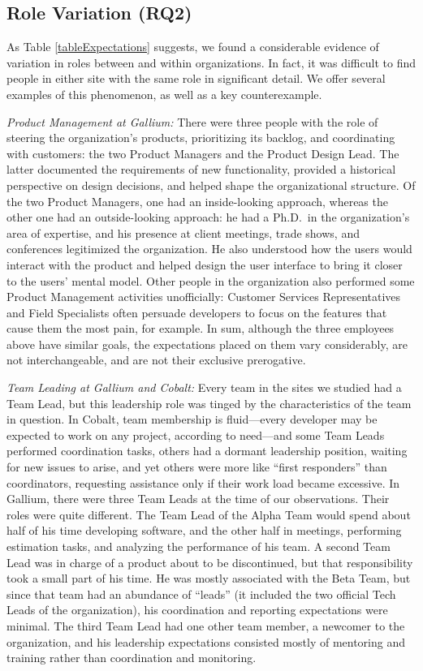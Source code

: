 \documentclass[10pt, conference, compsocconf]{IEEEtran}
\begin{document}
\subsection{Role Variation (RQ2)}

As Table \ref{tableExpectations} suggests, we found a considerable evidence of variation in roles between and within organizations. In fact, it was difficult to find people in either site with the same role in significant detail. We offer several examples of this phenomenon, as well as a key counterexample.

\emph{Product Management at Gallium:} There were three people with the role of steering the organization's products, prioritizing its backlog, and coordinating with customers: the two Product Managers and the Product Design Lead. The latter documented the requirements of new functionality, provided a historical perspective on design decisions, and helped shape the organizational structure. Of the two Product Managers, one had an inside-looking approach, whereas the other one had an outside-looking approach: he had a Ph.D.\ in the organization's area of expertise, and his presence at client meetings, trade shows, and conferences legitimized the organization. He also understood how the users would interact with the product and helped design the user interface to bring it closer to the users' mental model. Other people in the organization also performed some Product Management activities unofficially: Customer Services Representatives and Field Specialists often persuade developers to focus on the features that cause them the most pain, for example. In sum, although the three employees above have similar goals, the expectations placed on them vary considerably, are not interchangeable, and are not their exclusive prerogative.

\emph{Team Leading at Gallium and Cobalt:} Every team in the sites we studied had a Team Lead, but this leadership role was tinged by the characteristics of the team in question. In Cobalt, team membership is fluid---every developer may be expected to work on any project, according to need---and some Team Leads performed coordination tasks, others had a dormant leadership position, waiting for new issues to arise, and yet others were more like ``first responders'' than coordinators, requesting assistance only if their work load became excessive. In Gallium, there were three Team Leads at the time of our observations. Their roles were quite different. The Team Lead of the Alpha Team would spend about half of his time developing software, and the other half in meetings, performing estimation tasks, and analyzing the performance of his team. A second Team Lead was in charge of a product about to be discontinued, but that responsibility took a small part of his time. He was mostly associated with the Beta Team, but since that team had an abundance of ``leads'' (it included the two official Tech Leads of the organization), his coordination and reporting expectations were minimal. The third Team Lead had one other team member, a newcomer to the organization, and his leadership expectations consisted mostly of mentoring and training rather than coordination and monitoring.
\end{document}
